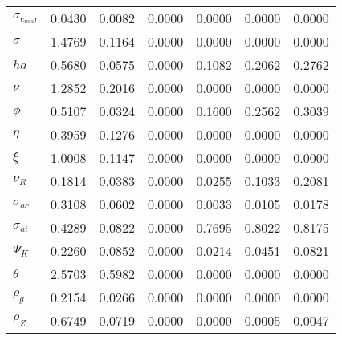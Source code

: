 \begin{center}
\begin{longtable}{lcccccc}
$ \sigma_{{e_{muI}}}   $	 & 	          0.0430	 & 	          0.0082	 & 	          0.0000	 & 	          0.0000	 & 	          0.0000	 & 	          0.0000 \\ 
$ {\sigma}             $	 & 	          1.4769	 & 	          0.1164	 & 	          0.0000	 & 	          0.0000	 & 	          0.0000	 & 	          0.0000 \\ 
$ {ha}                 $	 & 	          0.5680	 & 	          0.0575	 & 	          0.0000	 & 	          0.1082	 & 	          0.2062	 & 	          0.2762 \\ 
$ \nu                  $	 & 	          1.2852	 & 	          0.2016	 & 	          0.0000	 & 	          0.0000	 & 	          0.0000	 & 	          0.0000 \\ 
$ {\phi}               $	 & 	          0.5107	 & 	          0.0324	 & 	          0.0000	 & 	          0.1600	 & 	          0.2562	 & 	          0.3039 \\ 
$ {\eta}               $	 & 	          0.3959	 & 	          0.1276	 & 	          0.0000	 & 	          0.0000	 & 	          0.0000	 & 	          0.0000 \\ 
$ \xi                  $	 & 	          1.0008	 & 	          0.1147	 & 	          0.0000	 & 	          0.0000	 & 	          0.0000	 & 	          0.0000 \\ 
$ {\nu_R}              $	 & 	          0.1814	 & 	          0.0383	 & 	          0.0000	 & 	          0.0255	 & 	          0.1033	 & 	          0.2081 \\ 
$ {\sigma_{ac}}        $	 & 	          0.3108	 & 	          0.0602	 & 	          0.0000	 & 	          0.0033	 & 	          0.0105	 & 	          0.0178 \\ 
$ {\sigma_{ai}}        $	 & 	          0.4289	 & 	          0.0822	 & 	          0.0000	 & 	          0.7695	 & 	          0.8022	 & 	          0.8175 \\ 
$ {\Psi_{K}}           $	 & 	          0.2260	 & 	          0.0852	 & 	          0.0000	 & 	          0.0214	 & 	          0.0451	 & 	          0.0821 \\ 
$ {\theta}             $	 & 	          2.5703	 & 	          0.5982	 & 	          0.0000	 & 	          0.0000	 & 	          0.0000	 & 	          0.0000 \\ 
$ {\rho_g}             $	 & 	          0.2154	 & 	          0.0266	 & 	          0.0000	 & 	          0.0000	 & 	          0.0000	 & 	          0.0000 \\ 
$ {\rho_Z}             $	 & 	          0.6749	 & 	          0.0719	 & 	          0.0000	 & 	          0.0000	 & 	          0.0005	 & 	          0.0047 \\ 

\end{longtable}
\end{center}
